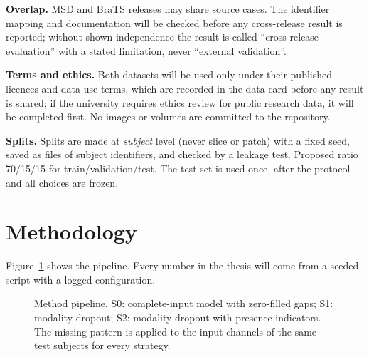 \documentclass[11pt,a4paper]{article}
\begin{document}
\textbf{Overlap.} MSD and BraTS releases may share source cases. The identifier mapping and documentation will be checked before any cross-release result is reported; without shown independence the result is called ``cross-release evaluation'' with a stated limitation, never ``external validation''.

\textbf{Terms and ethics.} Both datasets will be used only under their published licences and data-use terms, which are recorded in the data card before any result is shared; if the university requires ethics review for public research data, it will be completed first. No images or volumes are committed to the repository.

\textbf{Splits.} Splits are made at \emph{subject} level (never slice or patch) with a fixed seed, saved as files of subject identifiers, and checked by a leakage test. Proposed ratio 70/15/15 for train/validation/test. The test set is used once, after the protocol and all choices are frozen.

\section{Methodology}
Figure~\ref{fig:pipeline} shows the pipeline. Every number in the thesis will come from a seeded script with a logged configuration.

\begin{figure}[ht]
\centering
{}
\caption{Method pipeline. S0: complete-input model with zero-filled gaps; S1: modality dropout; S2: modality dropout with presence indicators. The missing pattern is applied to the input channels of the same test subjects for every strategy.}
\label{fig:pipeline}
\end{figure}
\end{document}
